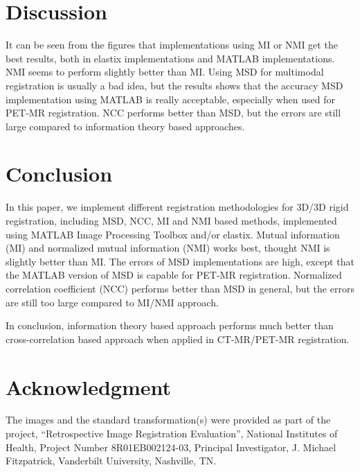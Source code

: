 \documentclass{IEEEtran}
\begin{document}
  \section{Discussion}

  It can be seen from the figures that implementations using MI or NMI get the best results, both in elastix implementations and MATLAB implementations. NMI seems to perform slightly better than MI. Using MSD for multimodal registration is usually a bad idea, but the results shows that the accuracy MSD implementation using MATLAB is really acceptable, especially when used for PET-MR registration. NCC performs better than MSD, but the errors are still large compared to information theory based approaches.

  \section{Conclusion}

  In this paper, we implement different registration methodologies for 3D/3D rigid registration, including MSD, NCC, MI and NMI based methods, implemented using MATLAB Image Processing Toolbox and/or elastix. Mutual information (MI) and normalized mutual information (NMI) works best, thought NMI is slightly better than MI. The errors of MSD implementations are high, except that the MATLAB version of MSD is capable for PET-MR registration. Normalized correlation coefficient (NCC) performs better than MSD in general, but the errors are still too large compared to MI/NMI approach.

  In conclusion, information theory based approach performs much better than cross-correlation based approach when applied in CT-MR/PET-MR registration.

  \section{Acknowledgment}

  The images and the standard transformation(s) were provided as part of the project, ``Retrospective Image Registration Evaluation'', National Institutes of Health, Project Number 8R01EB002124-03, Principal Investigator, J. Michael Fitzpatrick, Vanderbilt University, Nashville, TN.

  
  
\end{document}
